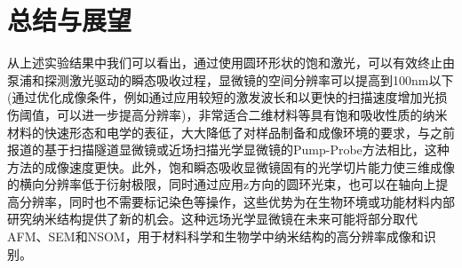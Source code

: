 \documentclass{phyasgn}\usepackage{nag}
\begin{document}
\section{总结与展望}
从上述实验结果中我们可以看出，通过使用圆环形状的饱和激光，可以有效终止由泵浦和探测激光驱动的瞬态吸收过程，显微镜的空间分辨率可以提高到100nm以下(通过优化成像条件，例如通过应用较短的激发波长和以更快的扫描速度增加光损伤阈值，可以进一步提高分辨率)，非常适合二维材料等具有饱和吸收性质的纳米材料的快速形态和电学的表征，大大降低了对样品制备和成像环境的要求，与之前报道的基于扫描隧道显微镜或近场扫描光学显微镜的Pump-Probe方法相比，这种方法的成像速度更快。此外，饱和瞬态吸收显微镜固有的光学切片能力使三维成像的横向分辨率低于衍射极限，同时通过应用z方向的圆环光束，也可以在轴向上提高分辨率，同时也不需要标记染色等操作，这些优势为在生物环境或功能材料内部研究纳米结构提供了新的机会。这种远场光学显微镜在未来可能将部分取代AFM、SEM和NSOM，用于材料科学和生物学中纳米结构的高分辨率成像和识别。
\printbibliography[heading=bibintoc]
\end{document}
